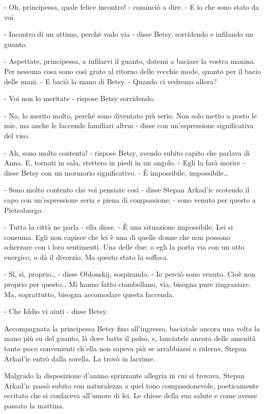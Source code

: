 - Oh, principessa, quale felice incontro! - cominciò a dire. - E io che sono stato da voi. 

- Incontro di un attimo, perché vado via - disse Betsy, sorridendo e infilando un guanto. 

- Aspettate, principessa, a infilarvi il guanto, datemi a baciare la vostra manina. Per nessuna cosa sono così grato al ritorno delle vecchie mode, quanto per il bacio delle mani. - E baciò la mano di Betsy. - Quando ci vedremo allora? 

- Voi non lo meritate - rispose Betsy sorridendo. 

- No, lo merito molto, perché sono diventato più serio. Non solo metto a posto le mie, ma anche le faccende familiari altrui - disse con un'espressione significativa del viso. 

- Ah, sono molto contenta! - rispose Betsy, avendo subito capito che parlava di Anna. E, tornati in sala, stettero in piedi in un angolo. - Egli la farà morire - disse Betsy con un mormorio significativo. - È impossibile, impossibile\ldots{} 

- Sono molto contento che voi pensiate così - disse Stepan Arkad'ic scotendo il capo con un'espressione seria e piena di compassione; - sono venuto per questo a Pietroburgo. 

- Tutta la città ne parla - ella disse. - È una situazione impossibile. Lei si consuma. Egli non capisce che lei è una di quelle donne che non possono scherzare con i loro sentimenti. Una delle due: o egli la porta via con un atto energico, o dà il divorzio. Ma questo stato la soffoca. 

- Sì, sì, proprio\ldots{} - disse Oblonskij, sospirando. - Io perciò sono venuto. Cioè non proprio per questo\ldots{} Mi hanno fatto ciambellano, via, bisogna pure ringraziare. Ma, soprattutto, bisogna accomodare questa faccenda. 

- Che Iddio vi aiuti - disse Betsy. 

Accompagnata la principessa Betsy fino all'ingresso, baciatale ancora una volta la mano più su del guanto, là dove batte il polso, e, lanciatele ancora delle amenità tanto poco convenienti ch'ella non sapeva più se arrabbiarsi o riderne, Stepan Arkad'ic entrò dalla sorella. La trovò in lacrime. 

Malgrado la disposizione d'animo sprizzante allegria in cui si trovava, Stepan Arkad'ic passò subito con naturalezza a quel tono compassionevole, poeticamente eccitato che si confaceva all'umore di lei. Le chiese della sua salute e come avesse passato la mattina. 

